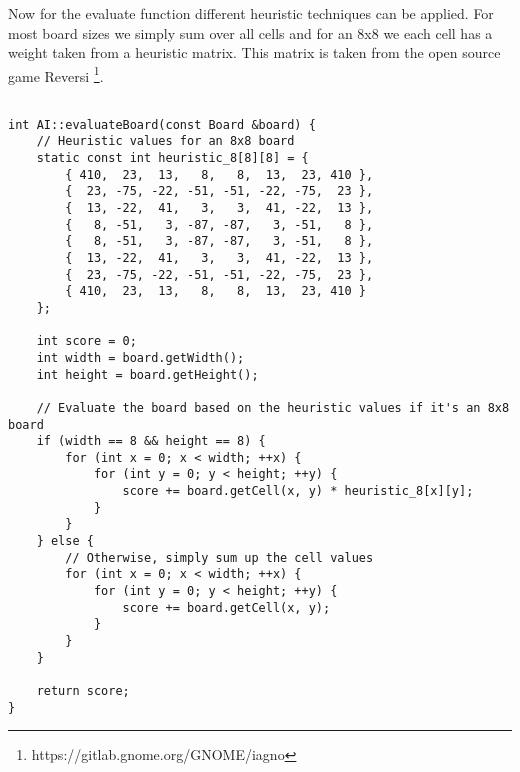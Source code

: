 \documentclass[a4paper,12pt]{article}
\begin{document}
Now for the evaluate function different heuristic techniques can be 
applied. For most board sizes we simply sum over all cells and for 
an 8x8 we each cell has a weight taken from a heuristic matrix. This 
matrix is taken from the open source game Reversi \footnote{https://gitlab.gnome.org/GNOME/iagno}.
\begin{verbatim}

int AI::evaluateBoard(const Board &board) {
    // Heuristic values for an 8x8 board
    static const int heuristic_8[8][8] = {
        { 410,  23,  13,   8,   8,  13,  23, 410 },
        {  23, -75, -22, -51, -51, -22, -75,  23 },
        {  13, -22,  41,   3,   3,  41, -22,  13 },
        {   8, -51,   3, -87, -87,   3, -51,   8 },
        {   8, -51,   3, -87, -87,   3, -51,   8 },
        {  13, -22,  41,   3,   3,  41, -22,  13 },
        {  23, -75, -22, -51, -51, -22, -75,  23 },
        { 410,  23,  13,   8,   8,  13,  23, 410 }
    };

    int score = 0;
    int width = board.getWidth();
    int height = board.getHeight();

    // Evaluate the board based on the heuristic values if it's an 8x8 board
    if (width == 8 && height == 8) {
        for (int x = 0; x < width; ++x) {
            for (int y = 0; y < height; ++y) {
                score += board.getCell(x, y) * heuristic_8[x][y];
            }
        }
    } else {
        // Otherwise, simply sum up the cell values
        for (int x = 0; x < width; ++x) {
            for (int y = 0; y < height; ++y) {
                score += board.getCell(x, y);
            }
        }
    }

    return score;
}
\end{verbatim}
\end{document}
